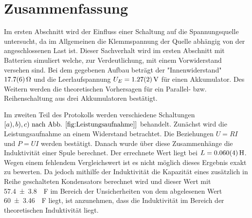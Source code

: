 
\section{Zusammenfassung}
Im ersten Abschnitt wird der Einfluss einer Schaltung auf die Spannungsquelle untersucht, da im Allgemeinen die Klemmspannung der Quelle abhängig von der angeschlossenen Last ist. Dieser Sachverhalt wird im ersten Abschnitt mit Batterien simuliert welche, zur Verdeutlichung, mit einem Vorwiderstand versehen sind. Bei dem gegebenen Aufbau beträgt der "Innenwiderstand" $\SI{17.7+-0.6}{\ohm}$ und die Leerlaufspannung $U_E=\SI{1.27+-0.02}{V}$ für einen Akkumulator. Des Weitern werden die theoretischen Vorhersagen für ein Parallel- bzw. Reihenschaltung aus drei Akkumulatoren bestätigt.

Im zweiten Teil des Protokolls werden verschiedene Schaltungen  $\left[ a),b),c)  \text{ nach Abb. \ref{fig:Leistungsaufnahme}} \right]$ behandelt.
Zunächst wird die Leistungsaufnahme an einem Widerstand betrachtet. Die Beziehungen $U=RI$ und $P=UI$ werden bestätigt.
Danach wurde über diese Zusammenhänge die Induktivität einer Spule berechnet.
Der errechnete Wert liegt bei $L= \SI{0,060+-0,004}{H}$. Wegen einem fehlendem Vergleichswert ist es nicht möglich dieses Ergebnis exakt zu bewerten. 
Da jedoch  mithilfe der Induktivität die Kapazität eines zusätzlich in Reihe geschalteten Kondensators berechnet wird und dieser Wert mit \SI{57.4+-3.8}{\mu F} im Bereich der Unsicherheiten von dem abgelesenen Wert \SI{60+-3.46}{\mu F} liegt, ist anzunehmen, dass die Induktivität im Bereich der theoretischen Induktivität liegt.






